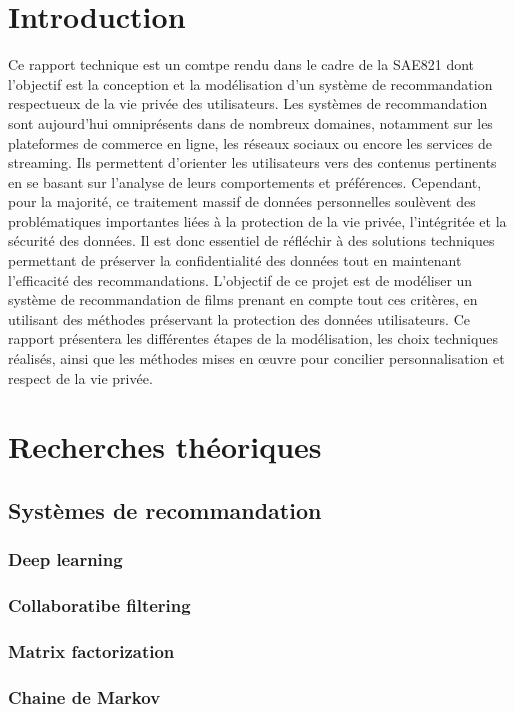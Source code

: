 \documentclass{article}
\begin{document}
\tableofcontents
\newpage

\section*{Introduction}
Ce rapport technique est un comtpe rendu dans le cadre de la SAE821 dont l'objectif est la conception et la modélisation d’un système de recommandation respectueux de la vie privée des utilisateurs. Les systèmes de recommandation sont aujourd’hui omniprésents dans de nombreux domaines, notamment sur les plateformes de commerce en ligne, les réseaux sociaux ou encore les services de streaming. Ils permettent d’orienter les utilisateurs vers des contenus pertinents en se basant sur l’analyse de leurs comportements et préférences.
Cependant, pour la majorité, ce traitement massif de données personnelles soulèvent des problématiques importantes liées à la protection de la vie privée, l'intégritée et la sécurité des données. Il est donc essentiel de réfléchir à des solutions techniques permettant de préserver la confidentialité des données tout en maintenant l’efficacité des recommandations.
L’objectif de ce projet est de modéliser un système de recommandation de films prenant en compte tout ces critères, en utilisant des méthodes préservant la protection des données utilisateurs. Ce rapport présentera les différentes étapes de la modélisation, les choix techniques réalisés, ainsi que les méthodes mises en œuvre pour concilier personnalisation et respect de la vie privée.

\section{Recherches théoriques}
\subsection{Systèmes de recommandation}
\subsubsection{Deep learning}
\subsubsection{Collaboratibe filtering}
\subsubsection{Matrix factorization}
\subsubsection{Chaine de Markov}
\end{document}

